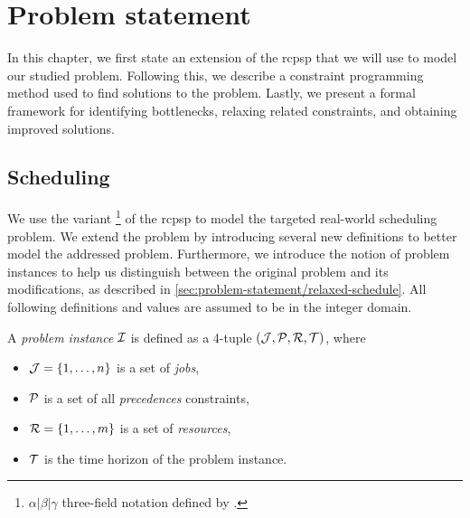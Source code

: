 \chapter{Problem statement} \label{chap:problem-statement}

In this chapter, we first state an extension of the \ac{rcpsp} that we will use to model our studied problem.
Following this, we describe a constraint programming method used to find solutions to the problem.
Lastly, we present a formal framework for identifying bottlenecks, relaxing related constraints,
and obtaining improved solutions.

\section{Scheduling} \label{sec:problem-statement/scheduling}

We use the \Problem{} variant%
\footnote{$\alpha | \beta | \gamma$ three-field notation defined by \citet{Brucker1999}.}
of the \ac{rcpsp} to model the targeted real-world scheduling problem.
We extend the problem by introducing several new definitions to better model the addressed problem.
Furthermore, we introduce the notion of problem instances to help us distinguish between the original problem
and its modifications, as described in \cref{sec:problem-statement/relaxed-schedule}.
All following definitions and values are assumed to be in the integer domain.

\begin{defn} \label{def:problem-instance}
A \emph{problem instance} $\mathcal{I}$ is defined as a 4-tuple $(\mathcal{J}, \mathcal{P}, \mathcal{R}, \mathcal{T})$,
where
\begin{itemize}
    \item $\mathcal{J} = \{1, \dots, n\}$ is a set of \emph{jobs},
    \item $\mathcal{P}$ is a set of all \emph{precedences} constraints,
    \item $\mathcal{R} = \{1, \dots, m\}$ is a set of \emph{resources},
    \item $\mathcal{T}$ is the time horizon of the problem instance.
\end{itemize}
\end{defn}

